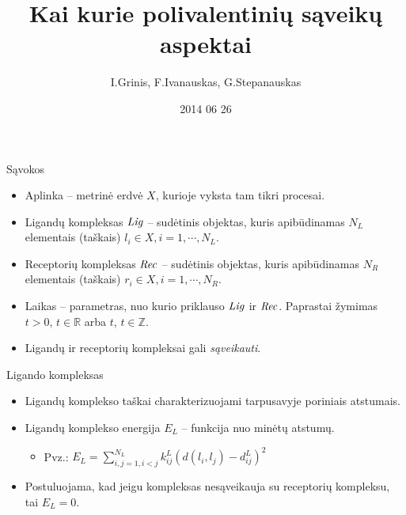 \documentclass[11pt]{beamer}
\author{I.Grinis, F.Ivanauskas, G.Stepanauskas}
\title{Kai kurie polivalentinių sąveikų aspektai}
\institute{VU MIF}
\date{2014 06 26}
\begin{document}
\begin{frame}
\titlepage
\end{frame}

\begin{frame}
\tableofcontents
\end{frame}


\begin{frame}{Sąvokos}
\begin{itemize}
\item Aplinka -- metrinė erdvė $X$, kurioje vyksta tam tikri procesai.
\item Ligandų kompleksas $\mbox{\textit{Lig}}$ -- sudėtinis objektas, kuris apibūdinamas $N_L$ elementais (taškais)   $l_i \in X, i=1,\cdots, N_L$.
\item Receptorių  kompleksas $\mbox{\textit{Rec}}$ -- sudėtinis objektas, kuris apibūdinamas $N_R$ elementais (taškais) $ r_i \in X, i=1, \cdots, N_R$. 
\item Laikas -- parametras, nuo kurio priklauso $\mbox{\textit{Lig}}$ ir $\mbox{\textit{Rec}}$. Paprastai žymimas $t>0$, $t \in \mathbb{R}$ arba $t$, $t \in \mathbb{Z}$.
\item Ligandų ir receptorių kompleksai gali \textit{sąveikauti}.
\end{itemize}
\end{frame}


\begin{frame}{Ligando kompleksas}
\begin{itemize}
\item Ligandų komplekso taškai charakterizuojami tarpusavyje poriniais atstumais.
\item Ligandų komplekso energija $E_L$  -- funkcija nuo minėtų atstumų.
    \begin{itemize}
       \item Pvz.: $E_L = \sum\limits_{i,j=1,i<j}^{N_L} k_{ij}^L (d(l_i,l_j) - d_{ij}^L)^{2} $
    \end{itemize}
\item Postuluojama, kad jeigu kompleksas nesąveikauja su receptorių kompleksu, tai $E_L = 0$.
\end{itemize}
\end{frame}

\end{document}
